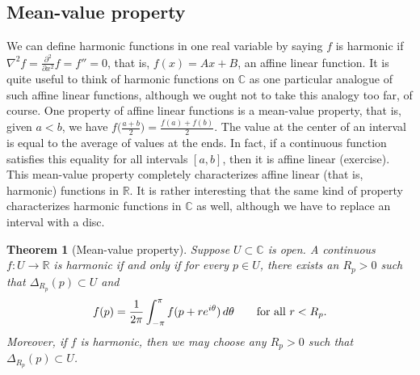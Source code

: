 \documentclass[12pt,openany]{book}
\newcommand{\avoidbreak}{\postdisplaypenalty=100}
\newcommand{\C}{{\mathbb{C}}}
\newcommand{\R}{{\mathbb{R}}}
\theoremstyle{plain}
\newtheorem{thm}{Theorem}[section]
\theoremstyle{remark}
\theoremstyle{definition}
\theoremstyle{exercise}
\theoremstyle{example}
\begin{document}
\subsection{Mean-value property}

We can define harmonic functions in one real variable
by saying $f$ is harmonic if
$\nabla^2 f = \frac{\partial^2}{\partial x^2} f = f'' = 0$, that is, $f(x) = Ax+B$, an affine
linear function.  It is quite useful to think of harmonic functions on $\C$ as one
particular analogue of such affine linear functions, although we ought
not to take this analogy too far, of course.
One property of affine linear functions is a mean-value property, that is,
given $a < b$, we have $f\bigl(\frac{a+b}{2}\bigr) = \frac{f(a)+f(b)}{2}$.  The
value at the center of an interval is equal to the average of values at the
ends.  In fact, if a continuous function satisfies this equality for all
intervals $[a,b]$, then it is
affine linear (exercise).  This mean-value property completely characterizes affine
linear (that is, harmonic) functions in $\R$.
It is rather interesting that the same kind of property characterizes
harmonic functions in $\C$ as well, although we have to replace an interval
with a disc.

\begin{thm}[Mean-value property]\label{thm:meanprop}
\pagebreak[0]
Suppose $U \subset \C$ is open.
A continuous 
$f \colon U \to \R$
is harmonic if and only if for every $p \in U$, there exists an $R_p >0$
such that $\Delta_{R_p}(p) \subset U$ and
\begin{equation*}
f(p) = \frac{1}{2\pi} \int_{-\pi}^{\pi} f(p+re^{i\theta})\, d\theta
\qquad \text{for all } r < R_p .
\avoidbreak
\end{equation*}
Moreover, if $f$ is harmonic, then we may choose any
$R_p > 0$ such that $\Delta_{R_p}(p) \subset U$.
\end{thm}
\end{document}
